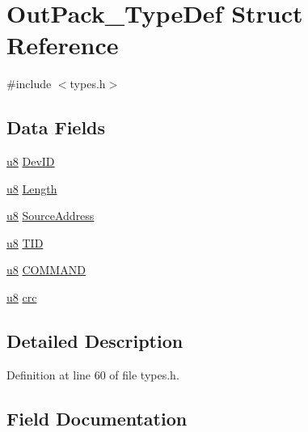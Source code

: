 \hypertarget{struct_out_pack___type_def}{}\section{Out\+Pack\+\_\+\+Type\+Def Struct Reference}
\label{struct_out_pack___type_def}


{\ttfamily \#include $<$types.\+h$>$}

\subsection*{Data Fields}
\begin{DoxyCompactItemize}
\item 
\hyperlink{types_8h_aed742c436da53c1080638ce6ef7d13de}{u8} \hyperlink{struct_out_pack___type_def_a99d407767f1bfeb6b7e54c646df80472}{Dev\+I\+D}
\item 
\hyperlink{types_8h_aed742c436da53c1080638ce6ef7d13de}{u8} \hyperlink{struct_out_pack___type_def_ab74cd1c00143927f7c83f0c651dad173}{Length}
\item 
\hyperlink{types_8h_aed742c436da53c1080638ce6ef7d13de}{u8} \hyperlink{struct_out_pack___type_def_adf5bc4e40bad06fdd0c2b4e48f18831b}{Source\+Address}
\item 
\hyperlink{types_8h_aed742c436da53c1080638ce6ef7d13de}{u8} \hyperlink{struct_out_pack___type_def_ad1076cc9b9c0e86656584b48e443d884}{T\+I\+D}
\item 
\hyperlink{types_8h_aed742c436da53c1080638ce6ef7d13de}{u8} \hyperlink{struct_out_pack___type_def_ac58783f48ac7f67dcefd76e7a9c02de5}{C\+O\+M\+M\+A\+N\+D}
\item 
\hyperlink{types_8h_aed742c436da53c1080638ce6ef7d13de}{u8} \hyperlink{struct_out_pack___type_def_af3f2b259cd01019a9d79b1966a858470}{crc}
\end{DoxyCompactItemize}


\subsection{Detailed Description}


Definition at line 60 of file types.\+h.



\subsection{Field Documentation}
\hypertarget{struct_out_pack___type_def_ac58783f48ac7f67dcefd76e7a9c02de5}{}
